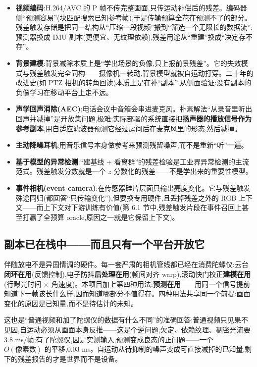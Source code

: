 \documentclass[UTF8,12pt,a4paper]{ctexart}
\begin{document}
\begin{itemize}
  \item \textbf{视频编码}:H.264/AVC 的 P 帧不传完整画面,只传运动补偿后的残差\cite{h264}。编码器侧``预测容易''(块匹配搜索已知参考帧),于是传输预算全花在预测不了的部分。残差触发存储是把同一结构从``压缩一段视频''搬到``筛选一个无限长的数据流'':预测器换成 IMU 副本(更便宜、无纹理依赖),残差用途从``重建''换成``决定存不存''。
  \item \textbf{背景建模}:背景减除\cite{piccardi2004,bouwmans2014}本质上是``学出场景的负像,只上报前景残差''。它的失效模式与残差触发完全同构——摄像机一转动,背景模型就被自运动打穿。二十年的改进史(如 PTZ 相机的转角回读)本质上是在补``副本'',从侧面验证:没有副本的负像学习在移动平台上走不远。
  \item \textbf{声学回声消除(AEC)}\cite{benesty2001}:电话会议中音箱会串进麦克风。朴素解法``从录音里听出回声并减掉''是开放集问题,极难;实际部署的系统直接把\textbf{扬声器的播放信号作为参考副本},用自适应滤波器预测它经过房间后在麦克风里的形态,然后减掉。
  \item \textbf{主动降噪耳机}:用音乐信号本身做参考来预测残留噪声,而不是重新``听''一遍。
  \item \textbf{基于模型的异常检测}:``建基线 + 看离群''的残差检验是工业界异常检测的主流范式。残差触发分数就是一个 $z$ 分数化的残差——不是学出来的重要性模型。
  \item \textbf{事件相机(event camera)}:在传感器硅片层面只输出亮度变化\cite{gallego2020}。它与残差触发殊途同归(都回答``只传输变化''),但要换专用硬件,且丢掉残差之外的 RGB 上下文——而上下文对下游训练有价值(第 6.1 节中,残差触发片段在事件召回上甚至打赢了全预算 oracle,原因之一就是它保留上下文)。
\end{itemize}

\subsection{副本已在栈中——而且只有一个平台开放它}
\label{sec:stack}

伴随放电不是异国情调的硬件。每一套严肃的相机管线都已经在消费陀螺仪:云台\textbf{闭环在用}(反馈控制),电子防抖\textbf{后处理在用}(帧间对齐 warp),滚动快门校正\textbf{建模在用}(行曝光时间 $\times$ 角速度)。本项目加上第四种用法:\textbf{预测在用}——用同一个信号提前知道下一帧该长什么样,因而知道哪部分不值得存。四种用法共享同一个前提:画面变化的原因是已知量,而不是待估计的未知。

这也是``普通视频和加了陀螺仪的数据有什么不同''的准确回答:普通视频只见果不见因,自运动必须从画面本身反推——这是个逆问题,欠定、依赖纹理、稠密光流要 3.8 ms/帧;有了陀螺仪,因是实测输入,预测变成良态的正问题——一个 $O(\text{像素数})$ 的平移,0.03 ms。自运动从待抑制的噪声变成可直接减掉的已知量,剩下的残差报告的才是世界而不是设备。
\end{document}
